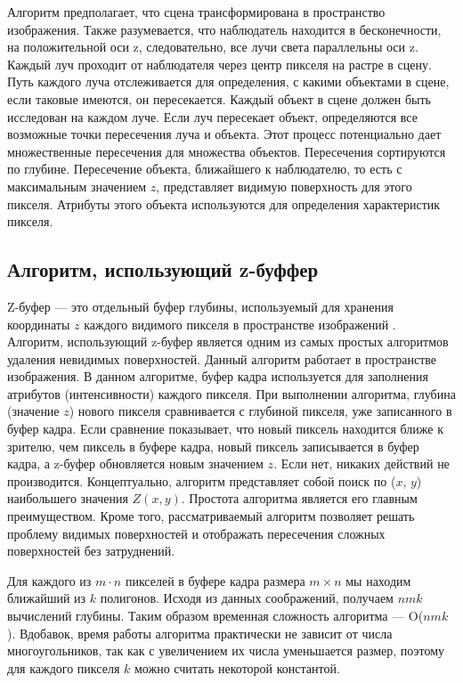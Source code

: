 \FloatBarrier

Алгоритм предполагает, что сцена трансформирована в пространство изображения. Также разумевается, что наблюдатель находится в бесконечности, на положительной оси z, следовательно, все лучи света параллельны оси z. Каждый луч проходит от наблюдателя через центр пикселя на растре в сцену. Путь каждого луча отслеживается для определения, с какими объектами в сцене, если таковые имеются, он пересекается. Каждый объект в сцене должен быть исследован на каждом луче. Если луч пересекает объект, определяются все возможные точки пересечения луча и объекта. Этот процесс потенциально дает множественные пересечения для множества объектов. Пересечения сортируются по глубине. Пересечение объекта, ближайшего к наблюдателю, то есть с максимальным значением $z$, представляет видимую поверхность для этого пикселя. Атрибуты этого объекта используются для определения характеристик пикселя.

\subsection{Алгоритм, использующий z-буффер}

Z-буфер --- это отдельный буфер глубины, используемый для хранения координаты $z$ каждого видимого пикселя в пространстве изображений \cite{math_cg}. Алгоритм, использующий z-буфер является одним из самых простых алгоритмов удаления невидимых поверхностей. Данный алгоритм работает в пространстве изображения. В данном алгоритме, буфер кадра используется для заполнения атрибутов (интенсивности) каждого пикселя. При выполнении алгоритма, глубина (значение $z$) нового пикселя сравнивается с глубиной пикселя, уже записанного в буфер кадра. Если сравнение показывает, что новый пиксель находится ближе к зрителю, чем пиксель в буфере кадра, новый пиксель записывается в буфер кадра, а z-буфер обновляется новым значением $z$. Если нет, никаких действий не производится. Концептуально, алгоритм представляет собой поиск по ($x$, $y$) наибольшего значения $Z(x, y)$. Простота алгоритма является его главным преимуществом. Кроме того, рассматриваемый алгоритм позволяет решать проблему видимых поверхностей и отображать пересечения сложных поверхностей без затруднений.

Для каждого из $m\cdot n$ пикселей в буфере кадра размера $m\times n$ мы находим ближайший из $k$ полигонов. Исходя из данных соображений, получаем $nmk$ вычислений глубины. Таким образом временная сложность алгоритма --- O($nmk$). Вдобавок, время работы алгоритма практически не зависит от числа многоугольников, так как с увеличением их числа уменьшается размер, поэтому для каждого пикселя $k$ можно считать некоторой константой.

